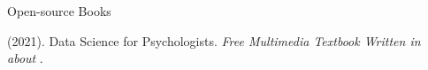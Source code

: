 

\pagebreak\begin{rSection}{\textrm{Open-source Books}}%
\begin{etaremune}
\item  \meb (2021). Data Science for Psychologists. \textit{Free Multimedia Textbook Written in \R about \R}. 

\end{etaremune}\end{rSection}%

